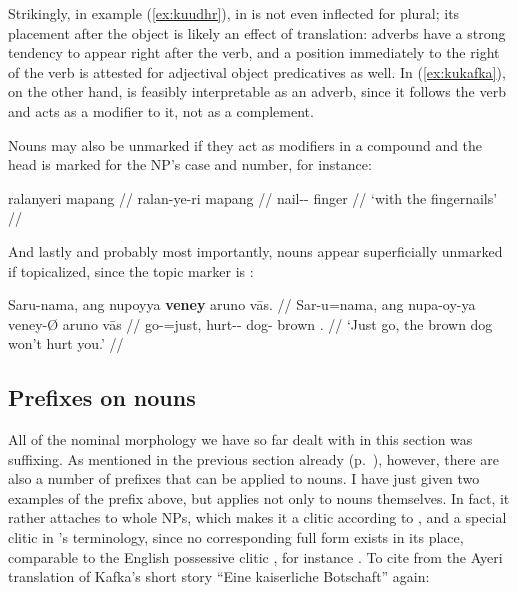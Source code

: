 \xe


Strikingly, in example (\ref{ex:kuudhr}),  in 
 is not even inflected for plural; its 
placement after the object is likely an effect of translation: adverbs 
have a strong tendency to appear right after the verb, and a position 
immediately to the right of the verb is attested for adjectival object 
predicatives as well. In (\ref{ex:kukafka}), on the other hand, 
 is feasibly interpretable as an adverb, 
since it follows the verb and acts as a modifier to it, not as a complement.

Nouns may also be unmarked if they act as modifiers in a compound and the head 
is marked for the NP's case and number, for instance:

\ex\begingl
	\gla ralanyeri mapang //
	\glb ralan-ye-ri mapang //
	\glc nail-\Pl{}-\Ins{} finger //
	\glft `with the fingernails' //
\endgl\xe

And lastly and probably most importantly, nouns appear superficially unmarked 
if topicalized, since the topic marker is :

\ex\begingl
	\gla Saru-nama, ang nupoyya \textbf{veney} aruno vās. //
	\glb Sar-u=nama, ang nupa-oy-ya veney-Ø aruno vās //
	\glc go-\Imp{}=just, \AgtT{} hurt-\Neg{}-\TsgM{} dog-\Top{} brown 
		\Ssg{}.\Parg{} //
	\glft `Just go, the brown dog won't hurt you.' //
\endgl\xe


\subsection{Prefixes on nouns}
\label{subsec:nounpref}

All of the nominal morphology we have so far dealt with in this section was 
suffixing. As mentioned in the previous section already 
(p.~\pageref{nounprefixes}), however, there are also a number of prefixes that 
can be applied to nouns. I have just given two examples of the prefix 
 above, but  applies not only to 
nouns themselves. In fact, it rather attaches to whole NPs, which makes it a 
clitic according to \citet[117]{klavans1985}, and a special 
clitic in \citeauthor{zwicky1977}'s terminology, since no corresponding full 
form exists in its place, comparable to the English possessive clitic , 
for instance \parencites[3, 
13]{zwicky1977}[295]{zwicky1985}[510]{zwickypullum1983}. To cite from the Ayeri 
translation of Kafka's short story \enquote{Eine kaiserliche Botschaft} again:

